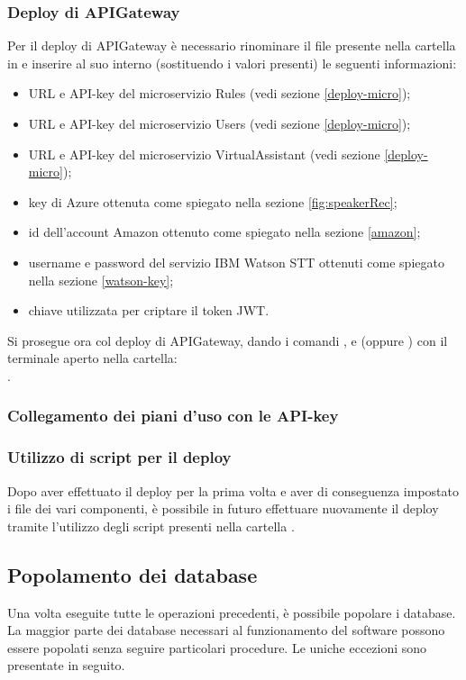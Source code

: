\subsubsection{Deploy di APIGateway}
Per il deploy di APIGateway è necessario rinominare il file  presente nella cartella  in  e inserire al suo interno (sostituendo i valori presenti) le seguenti informazioni:
\begin{itemize}
	\item URL e API-key del microservizio Rules (vedi sezione \ref{deploy-micro});
	\item URL e API-key del microservizio Users (vedi sezione \ref{deploy-micro});
	\item URL e API-key del microservizio VirtualAssistant (vedi sezione \ref{deploy-micro});
	\item key di Azure ottenuta come spiegato nella sezione \ref{fig:speakerRec};
	\item id dell'account Amazon ottenuto come spiegato nella sezione \ref{amazon};
	\item username e password del servizio IBM Watson STT ottenuti come spiegato nella sezione \ref{watson-key};
	\item chiave utilizzata per criptare il token JWT.
\end{itemize}
Si prosegue ora col deploy di APIGateway, dando i comandi  ,  e  (oppure ) con il terminale aperto nella cartella: \\ .

\subsubsection{Collegamento dei piani d'uso con le API-key}


\subsubsection{Utilizzo di script per il deploy}
Dopo aver effettuato il deploy per la prima volta e aver di conseguenza impostato i file  dei vari componenti, è possibile in futuro effettuare nuovamente il deploy tramite l'utilizzo degli script presenti nella cartella .

\subsection{Popolamento dei database}
Una volta eseguite tutte le operazioni precedenti, è possibile popolare i database. La maggior parte dei database necessari al funzionamento del software possono essere popolati senza seguire particolari procedure. Le uniche eccezioni sono presentate in seguito.


